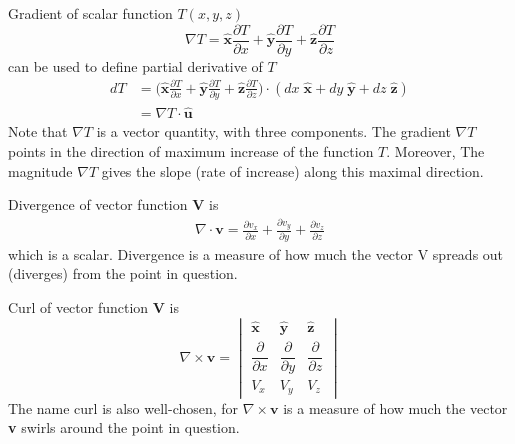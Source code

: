 \documentclass[../../../main.tex]{subfiles}
\begin{document}
Gradient of scalar function $T(x,y,z)$
\begin{equation*}
    \nabla T = \mathbf{\hat{x}}\frac{\partial T}{\partial x}+\mathbf{\hat{y}}\frac{\partial T}{\partial y}+\mathbf{\hat{z}}\frac{\partial T}{\partial z}
\end{equation*}
can be used to define partial derivative of $T$
\begin{align*}
    dT & = \bigg(  \mathbf{\hat{x}}\frac{\partial T}{\partial x}+ \mathbf{\hat{y}}\frac{\partial T}{\partial y}+ \mathbf{\hat{z}}\frac{\partial T}{\partial z} \bigg)\cdot (dx\;  \mathbf{\hat{x}}+dy\; \mathbf{\hat{y}}+dz\; \mathbf{\hat{z}}) \\
       & =\nabla T \cdot \mathbf{\hat{u}}
\end{align*}
Note that $\nabla T$ is a vector quantity, with three components. The gradient $\nabla T$ points in the direction of maximum increase of the function $T$. Moreover, The magnitude $\nabla T$ gives the slope (rate of increase) along this maximal direction.

Divergence of vector function \textbf{V} is
\begin{align*}
    \nabla \cdot  \mathbf{v}= \frac{\partial v_x}{\partial x}+\frac{\partial v_y}{\partial y}+\frac{\partial v_z}{\partial z}
\end{align*}
which is a scalar. Divergence is a measure of how much the vector V spreads out (diverges) from the point in question.

Curl of vector function \textbf{V} is
\begin{equation*}
    \nabla \times  \mathbf{v}=
    \begin{vmatrix}
        \mathbf{\hat{x}}              & \mathbf{\hat{y}}             & \mathbf{\hat{z}}              \\
        \dfrac{\partial }{\partial x} & \dfrac{\partial}{\partial y} & \dfrac{\partial }{\partial z} \\
        V_x                           & V_y                          & V_z
    \end{vmatrix}
\end{equation*}
The name curl is also well-chosen, for $\nabla \times  \mathbf{v}$ is a measure of how much the vector \textbf{v} swirls around the point in question.
\end{document}
